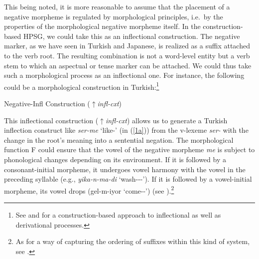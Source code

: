 \documentclass[output=paper]{langsci/langscibook}
\begin{document}
{This being noted, it is more reasonable to assume that the placement of a
negative morpheme is regulated by morphological principles, i.e.\ by
the properties of the morphological negative morpheme itself. In the
construction-based HPSG, we could take this as an inflectional
construction.  The negative marker, as we have seen in Turkish and Japanese, is realized as a suffix
attached to the verb root. The resulting combination is not
a word-level entity but a verb stem to which an aspectual or tense marker can be attached. We could thus take such a morphological process as an inflectional
one. For instance, the following could be a morphological
construction in Turkish:\footnote{See
\citet{Sag:12} and \citet{Hilpert:16} for a construction-based approach to
inflectional as well as derivational processes.}



\ea
Negative-Infl Construction ($\uparrow${\it infl-cxt}) \\
\z

%
This inflectional construction ($\uparrow${\it infl-cxt}) allows us to generate a Turkish inflection construct like {\it ser-me} `like-\NEG' (in
(\ref{1a})) from the v-lexeme {\it ser-} with the change in the root's meaning into a sentential negation. The morphological function F could ensure that the vowel of the negative morpheme {\it me} is subject to phonological changes depending on its environment. If it is followed by a consonant-initial morpheme, it undergoes vowel harmony with the vowel in the preceding syllable (e.g., {\it yika-n-ma-di} `wash-\REFL-\NEG-\PST'). If it is followed by a vowel-initial morpheme, its vowel drops (gel-m-iyor `come-\NEG-\PROG') (see \citet{kelepir}).\footnote{As
 for a way of capturing the ordering of suffixes within this kind of system,
 see \citet{Kim:16}.}


}
\end{document}
